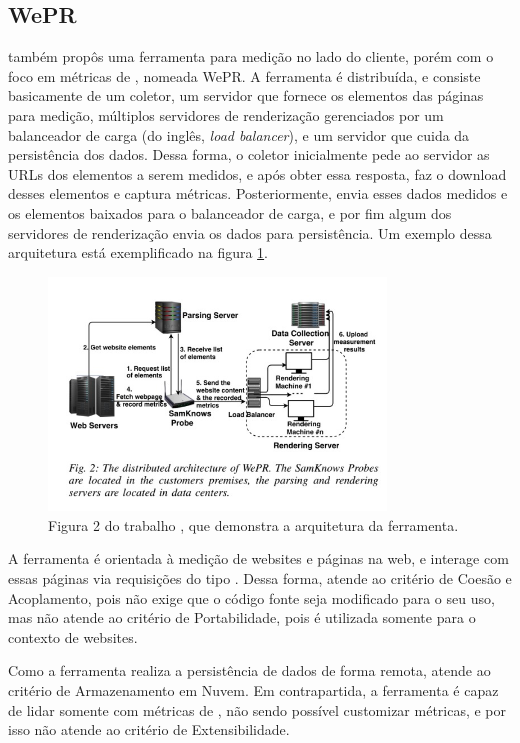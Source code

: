 \documentclass[12pt]{tcc}
\begin{document}
	\subsection{WePR}
	\label{WePR}
	\par \citet{Asrese2019MeasuringWL} também propôs uma ferramenta para medição no lado do cliente, porém com o foco em métricas de , nomeada WePR. A ferramenta é distribuída, e consiste basicamente de um coletor, um servidor que fornece os elementos das páginas para medição, múltiplos servidores de renderização gerenciados por um balanceador de carga (do inglês, \emph{load balancer}), e um servidor que cuida da persistência dos dados. Dessa forma, o coletor inicialmente pede ao servidor as URLs dos elementos a serem medidos, e após obter essa resposta, faz o download desses elementos e captura métricas. Posteriormente, envia esses dados medidos e os elementos baixados para o balanceador de carga, e por fim algum dos servidores de renderização envia os dados para persistência. Um exemplo dessa arquitetura está exemplificado na figura \ref{fig:wepr}.

	\begin{figure}[!ht]
		\centering
		\includegraphics[width=0.8\textwidth]{figures/wepr.jpeg}
		\caption{Figura 2 do trabalho \citep{Asrese2019MeasuringWL}, que demonstra a arquitetura da ferramenta. }
		\label{fig:wepr}
	\end{figure}

	A ferramenta é orientada à medição de websites e páginas na web, e interage com essas páginas via requisições do tipo . Dessa forma, atende ao critério de Coesão e Acoplamento, pois não exige que o código fonte seja modificado para o seu uso, mas não atende ao critério de Portabilidade, pois é utilizada somente para o contexto de websites.

	Como a ferramenta realiza a persistência de dados de forma remota, atende ao critério de Armazenamento em Nuvem. Em contrapartida, a ferramenta é capaz de lidar somente com métricas de , não sendo possível customizar métricas, e por isso não atende ao critério de Extensibilidade.
\end{document}
